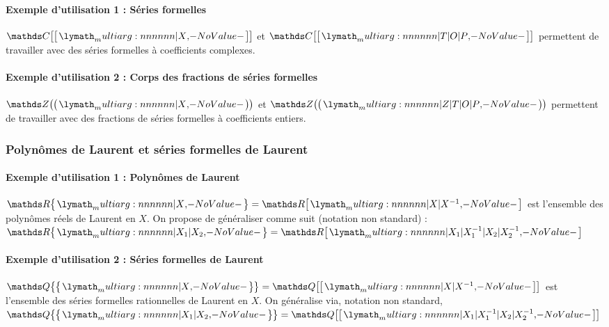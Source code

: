 \documentclass[12pt,a4paper]{article}
\theoremstyle{definition}
\begin{document}
            \paragraph{Exemple d'utilisation 1 : Séries formelles}

\begin{tcblisting}{}
$\serieset{\CC}{X}$ et $\serieset{\CC}{T | O | P}$ permettent de travailler avec des
séries formelles à coefficients complexes.
\end{tcblisting}



            \paragraph{Exemple d'utilisation 2 : Corps des fractions de séries formelles}

\begin{tcblisting}{}
$\seriefracset{\ZZ}{X}$ et $\seriefracset{\ZZ}{Z | T | O | P}$ permettent de travailler
avec des fractions de séries formelles à coefficients entiers.
\end{tcblisting}



        \subsubsection{Polynômes de Laurent et séries formelles de Laurent}

            \paragraph{Exemple d'utilisation 1 : Polynômes de Laurent}

\begin{tcblisting}{}
$\polylaurentset{\RR}{X} = \polyset{\RR}{X | X^{-1}}$ est l'ensemble des polynômes
réels de Laurent en $X$. On propose de généraliser comme suit (notation non standard) :
$\polylaurentset{\RR}{X_1 | X_2} = \polyset{\RR}{X_1 | X_1^{-1} | X_2 | X_2^{-1}}$
\end{tcblisting}



            \paragraph{Exemple d'utilisation 2 : Séries formelles de Laurent}

\begin{tcblisting}{}
$\serielaurentset{\QQ}{X} = \serieset{\QQ}{X | X^{-1}}$ est l'ensemble des séries 
formelles rationnelles de Laurent en $X$. On généralise via, notation non standard,
$\serielaurentset{\QQ}{X_1 | X_2} = \serieset{\QQ}{X_1 | X_1^{-1} | X_2 | X_2^{-1}}$
\end{tcblisting}
\end{document}
